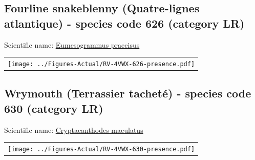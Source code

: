 \documentclass[12pt]{article}\usepackage[]{graphicx}\usepackage[]{color}
\begin{document}
\setcounter{figure}{0}

\hypertarget{sec:626}{%
\subsection{Fourline snakeblenny (Quatre-lignes atlantique) - species code 626 (category LR)}\label{sec:626}}

  


Scientific name: \href{http://www.marinespecies.org/aphia.php?p=taxdetails\&id=159817}{Eumesogrammus praecisus} \newline
\begin{minipage}{1.0\textwidth}
 \begin{tabular}{c}
\texttt{[image: ../Figures-Actual/RV-4VWX-626-presence.pdf]} \\ 
\end{tabular} 
\end{minipage}
\clearpage

\renewcommand\thefigure{\thesubsection\Alph{figure}}

\setcounter{figure}{0}

\hypertarget{sec:630}{%
\subsection{Wrymouth (Terrassier tacheté) - species code 630 (category LR)}\label{sec:630}}

  


Scientific name: \href{http://www.marinespecies.org/aphia.php?p=taxdetails\&id=159675}{Cryptacanthodes maculatus} \newline
\begin{minipage}{1.0\textwidth}
 \begin{tabular}{c}
\texttt{[image: ../Figures-Actual/RV-4VWX-630-presence.pdf]} \\ 
\end{tabular} 
\end{minipage}
\clearpage

\renewcommand\thefigure{\thesubsection\Alph{figure}}
\end{document}
